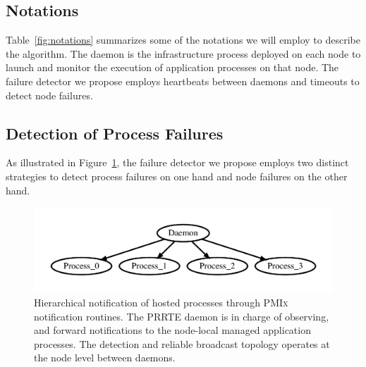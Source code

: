 \documentclass[5p,times,twocolumn]{elsarticle}
\newcommand{\prrte}[0]{\textsc{PRRTE}\xspace}
\newcommand{\pmix}[0]{\textsc{PMIx}\xspace}
\begin{document}
\subsection{Notations}

Table~\ref{fig:notations} summarizes some of the notations we will employ
to describe the algorithm. The daemon is the infrastructure
process deployed on each node to launch and monitor the execution of application
processes on that node. The failure detector we propose employs heartbeats
between daemons and timeouts to detect node failures.

\subsection{Detection of Process Failures}

As illustrated in Figure~\ref{fig:hosted}, the failure detector we propose
employs two distinct strategies to detect process failures on one hand
and node failures on the other hand.

\begin{figure}[h]
  \centering\vspace{-1em}
  \includegraphics[width=\linewidth]{server_client.pdf}\vspace{-2em}
  \caption{Hierarchical notification of hosted processes through \pmix notification routines. The \prrte daemon is in charge of observing, and forward notifications to the node-local managed application processes. The detection and reliable broadcast
  topology operates at the node level between daemons.}\label{fig:hosted}
\end{figure}
\end{document}
